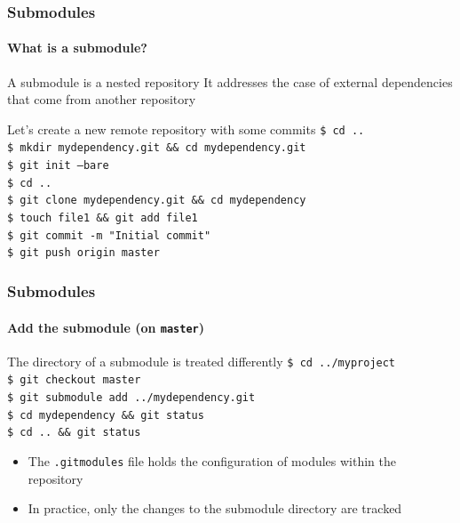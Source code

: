 \begin{frame}
\frametitle{Submodules}
\framesubtitle{What is a submodule?}

\begin{block}{A submodule is a nested repository}
It addresses the case of external dependencies that come from another repository
\end{block}
\pause

\begin{block}{Let's create a new remote repository with some commits}
\texttt{\$ cd ..} \\
\texttt{\$ mkdir mydependency.git \&\& cd mydependency.git} \\
\texttt{\$ git init ---bare} \\
\texttt{\$ cd ..} \\
\texttt{\$ git clone mydependency.git \&\& cd mydependency} \\
\texttt{\$ touch file1 \&\& git add file1} \\
\texttt{\$ git commit -m "Initial commit"} \\
\texttt{\$ git push origin master}
\end{block}

\end{frame}

\begin{frame}
\frametitle{Submodules}
\framesubtitle{Add the submodule (on \texttt{master})}

\begin{block}{The directory of a submodule is treated differently}
\texttt{\$ cd ../myproject} \\
\texttt{\$ git checkout master} \\
\texttt{\$ git submodule add ../mydependency.git} \\
\texttt{\$ cd mydependency \&\& git status} \\
\texttt{\$ cd .. \&\& git status}
\medskip
\begin{itemize}
\item The \texttt{.gitmodules} file holds the configuration of modules within the repository
\item In practice, only the changes to the submodule directory are tracked
\end{itemize}
\end{block}
\end{frame}

